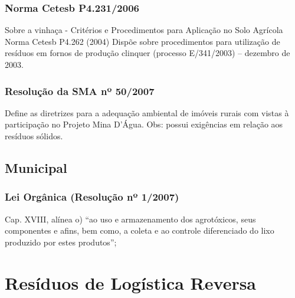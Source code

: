 \begin{subapend}
\begin{subsubapend}
		\subsubsection{Norma Cetesb P4.231/2006}
		Sobre a vinhaça - Critérios e Procedimentos para Aplicação no Solo Agrícola Norma Cetesb P4.262 (2004) Dispõe sobre procedimentos para utilização de resíduos em fornos de produção clinquer (processo E/341/2003) – dezembro de 2003.
		\subsubsection{Resolução da SMA nº 50/2007}
		Define as diretrizes para a adequação ambiental de imóveis rurais com vistas à participação no Projeto Mina D’Água. Obs: possui exigências em relação aos resíduos sólidos.
	\end{subsubapend}
\end{subapend}

\begin{subapend}
\subsection{Municipal}	
	\begin{subsubapend}
		\item \subsubsection{Lei Orgânica (Resolução nº 1/2007)}
		Cap. XVIII, alínea o) “ao uso e armazenamento dos agrotóxicos, seus componentes e afins, bem como, a coleta e ao controle diferenciado do lixo produzido por estes produtos”;   
	\end{subsubapend}
\end{subapend}

\section{Resíduos de Logística Reversa}

